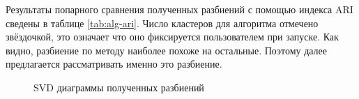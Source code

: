 \documentclass[12pt]{diploma}
\begin{document}
	Результаты попарного сравнения полученных разбиений с помощью индекса ARI сведены в таблице \ref{tab:alg-ari}. Число кластеров для алгоритма \AWard отмечено звёздочкой, это означает что оно фиксируется пользователем при запуске.  Как видно, разбиение по методу   \AWard наиболее похоже на остальные. Поэтому далее предлагается рассматривать именно это разбиение.
	
	\begin{figure}[h!] %
		\centering
		\caption{SVD диаграммы полученных разбиений}
		\label{fig:svd-sample}
	\end{figure}	
		
\end{document}
